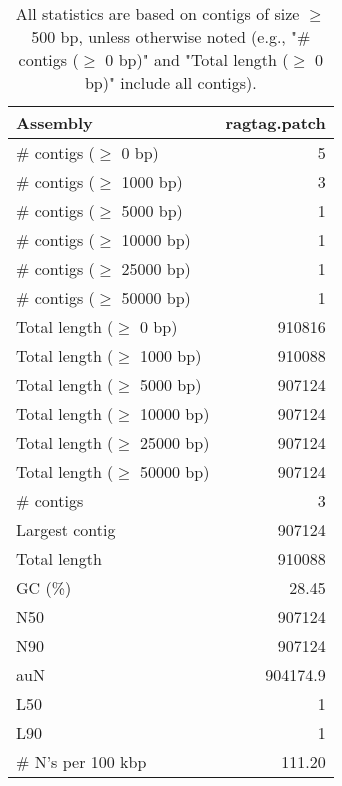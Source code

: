 \documentclass[12pt,a4paper]{article}
\begin{document}
\begin{table}[ht]
\begin{center}
\caption{All statistics are based on contigs of size $\geq$ 500 bp, unless otherwise noted (e.g., "\# contigs ($\geq$ 0 bp)" and "Total length ($\geq$ 0 bp)" include all contigs).}
\begin{tabular}{|l*{1}{|r}|}
\hline
Assembly & ragtag.patch \\ \hline
\# contigs ($\geq$ 0 bp) & 5 \\ \hline
\# contigs ($\geq$ 1000 bp) & 3 \\ \hline
\# contigs ($\geq$ 5000 bp) & 1 \\ \hline
\# contigs ($\geq$ 10000 bp) & 1 \\ \hline
\# contigs ($\geq$ 25000 bp) & 1 \\ \hline
\# contigs ($\geq$ 50000 bp) & 1 \\ \hline
Total length ($\geq$ 0 bp) & 910816 \\ \hline
Total length ($\geq$ 1000 bp) & 910088 \\ \hline
Total length ($\geq$ 5000 bp) & 907124 \\ \hline
Total length ($\geq$ 10000 bp) & 907124 \\ \hline
Total length ($\geq$ 25000 bp) & 907124 \\ \hline
Total length ($\geq$ 50000 bp) & 907124 \\ \hline
\# contigs & 3 \\ \hline
Largest contig & 907124 \\ \hline
Total length & 910088 \\ \hline
GC (\%) & 28.45 \\ \hline
N50 & 907124 \\ \hline
N90 & 907124 \\ \hline
auN & 904174.9 \\ \hline
L50 & 1 \\ \hline
L90 & 1 \\ \hline
\# N's per 100 kbp & 111.20 \\ \hline
\end{tabular}
\end{center}
\end{table}
\end{document}
